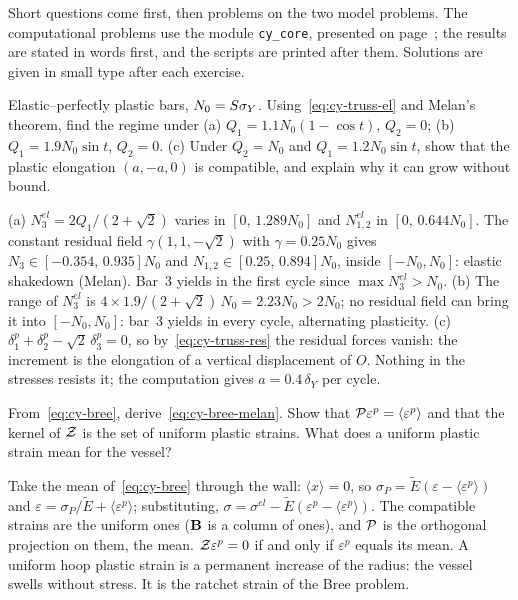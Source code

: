 \label{sec:cy-exo}
Short questions come first, then problems on the two model problems. The
computational problems use the module \texttt{cy\_core}, presented on
page~\pageref{sec:cy-aux}; the results are stated in words first, and the
scripts are printed after them. Solutions are given in small type after each
exercise.


\label{exo:cy-q-truss}
%
Elastic--perfectly plastic bars, $N_0=S\sigma_{Y}$. Using~\eqref{eq:cy-truss-el} and
Melan's theorem, find the regime under (a) $Q_1=1.1N_0(1-\cos t)$, $Q_2=0$;
(b) $Q_1=1.9N_0\sin t$, $Q_2=0$. (c) Under $Q_2=N_0$ and $Q_1=1.2N_0\sin t$,
show that the plastic elongation $(a,-a,0)$ is compatible, and explain why it
can grow without bound.
\begin{solution}
(a) $N^{el}_3=2Q_1/(2+\sqrt2)$ varies in $[0,\,1.289N_0]$ and $N^{el}_{1,2}$ in
$[0,\,0.644N_0]$. The constant residual field $\gamma(1,1,-\sqrt2)$ with
$\gamma=0.25N_0$ gives $N_3\in[-0.354,\,0.935]N_0$ and
$N_{1,2}\in[0.25,\,0.894]N_0$, inside $[-N_0,N_0]$: elastic shakedown (Melan).
Bar~3 yields in the first cycle since $\max N^{el}_3>N_0$. (b) The range of
$N^{el}_3$ is $4\times1.9/(2+\sqrt2)\,N_0=2.23N_0>2N_0$; no residual field can
bring it into $[-N_0,N_0]$: bar~3 yields in every cycle, alternating
plasticity. (c) $\delta^p_1+\delta^p_2-\sqrt2\,\delta^p_3=0$, so
by~\eqref{eq:cy-truss-res} the residual forces vanish: the increment is the
elongation of a vertical displacement of $O$. Nothing in the stresses
resists it; the computation gives $a=0.4\,\delta_Y$ per cycle.
\end{solution}

\label{exo:cy-q-bree}
%
From~\eqref{eq:cy-bree}, derive~\eqref{eq:cy-bree-melan}. Show that
$\mathcal{P}\varepsilon^p=\langle\varepsilon^p\rangle$ and that the kernel of $\mathcal{Z}$ is
the set of uniform plastic strains. What does a uniform plastic strain mean
for the vessel?
\begin{solution}
Take the mean of~\eqref{eq:cy-bree} through the wall: $\langle x\rangle=0$, so
$\sigma_P=\tilde E(\varepsilon-\langle\varepsilon^p\rangle)$ and
$\varepsilon=\sigma_P/\tilde E+\langle\varepsilon^p\rangle$; substituting,
$\sigma=\sigma^{el}-\tilde E(\varepsilon^p-\langle\varepsilon^p\rangle)$. The
compatible strains are the uniform ones ($\mathbf{B}$ is a column of ones), and
$\mathcal{P}$ is the orthogonal projection on them, the mean. $\mathcal{Z}\varepsilon^p=0$
if and only if $\varepsilon^p$ equals its mean. A uniform hoop plastic strain
is a permanent increase of the radius: the vessel swells without stress. It
is the ratchet strain of the Bree problem.
\end{solution}

